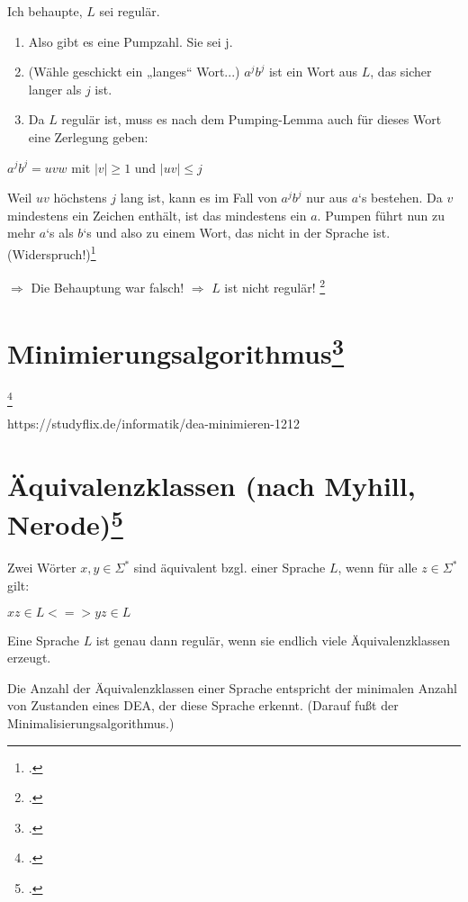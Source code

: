 \documentclass{lehramt-informatik-haupt}
\begin{document}
Ich behaupte, $L$ sei regulär.

\begin{enumerate}
\item Also gibt es eine Pumpzahl. Sie sei j.
\item (Wähle geschickt ein „langes“ Wort...)
$a^j b^j$ ist ein Wort aus $L$, das sicher langer als $j$ ist.
\item Da $L$ regulär ist, muss es nach dem Pumping-Lemma auch für dieses
Wort eine Zerlegung geben:
\end{enumerate}

$a^j b^j = uvw$ mit $|v| \geq 1$ und $|uv| \leq j$

Weil $uv$ höchstens $j$ lang ist, kann es im Fall von $a^j b^j$ nur aus
$a$‘s bestehen. Da $v$ mindestens ein Zeichen enthält, ist das
mindestens ein $a$. Pumpen führt nun zu mehr $a$‘s als $b$‘s und also zu
einem Wort, das nicht in der Sprache ist. (Widerspruch!)\footcite{wiki:pumping}

$\Rightarrow$ Die Behauptung war falsch!
$\Rightarrow$ $L$ ist nicht regulär!
\footcite[Seite 63-64]{theo:fs:1}

%

\section{Minimierungsalgorithmus\footcite[Seite 47-57]{vossen}}

\footcite[Seite 51-62]{theo:fs:1}

https://studyflix.de/informatik/dea-minimieren-1212

%

\section{Äquivalenzklassen (nach Myhill, Nerode)\footcite{theo:fs:}}

Zwei Wörter $x, y \in \Sigma^*$ sind äquivalent bzgl. einer Sprache $L$,
wenn für alle $z \in Σ^*$ gilt:

$xz \in L <=> yz \in L$

Eine Sprache $L$ ist genau dann regulär, wenn sie endlich viele
Äquivalenzklassen erzeugt.

Die Anzahl der Äquivalenzklassen einer Sprache entspricht der
minimalen Anzahl von Zustanden eines DEA, der diese Sprache
erkennt. (Darauf fußt der Minimalisierungsalgorithmus.)
\end{document}
